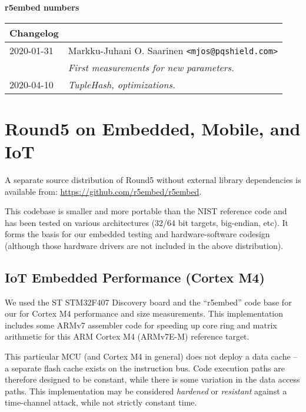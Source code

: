 \documentclass[a4paper]{article}
\begin{document}
\begin{center}
    {\large {\bf r5embed numbers \pdfdate}}

\vspace{3ex}
\begin{tabular}{l p{90mm}}
{\bf Changelog} \\
\hline
2020-01-31  & Markku-Juhani O. Saarinen \verb|<mjos@pqshield.com>| \\
            & {\it First measurements for new parameters.}  \\
2020-04-10  & {\it TupleHash, optimizations.}   \\
\hline
\end{tabular}
\end{center}


\section{Round5 on Embedded, Mobile, and IoT}

A separate source distribution of Round5 without external library
dependencies is available from: \url{https://github.com/r5embed/r5embed}.

This codebase is smaller and more portable than the NIST reference code and
has been tested on various architectures (32/64 bit targets, big-endian, etc).
It forms the basis for our embedded testing and hardware-software codesign
(although those hardware drivers are not included in the above distribution).

\subsection{IoT Embedded Performance (Cortex M4)}

We used the ST STM32F407 Discovery board and the ``r5embed'' code base for our
for Cortex M4 performance and size measurements. This implementation
includes some ARMv7 assembler code for speeding up core ring and matrix
arithmetic for this ARM Cortex M4 (ARMv7E-M) reference target.

This particular MCU (and Cortex M4 in general) does not deploy a data cache --
a separate flash cache exists on the instruction bus. Code execution paths are
therefore designed to be constant, while there is some variation in the data
access paths. This implementation may be considered \emph{hardened} or
\emph{resistant} against a time-channel attack, while not strictly constant
time.
\end{document}
